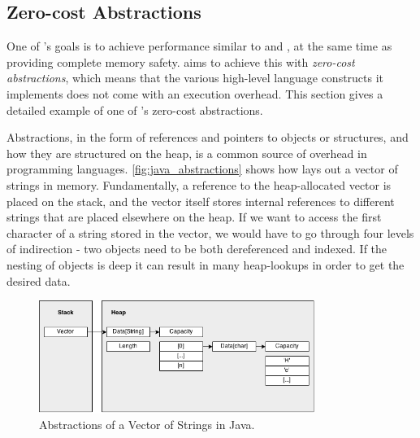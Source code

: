\subsection{Zero-cost Abstractions}
\label{chap:zero_cost_abstractions}

One of {\rust}'s goals is to achieve performance similar to {\C} and {\Cpp}, at the same time as providing complete memory safety.
{\rust} aims to achieve this with \emph{zero-cost abstractions}, which means that the various high-level language constructs it implements does not come with an execution overhead.
This section gives a detailed example of one of {\rust}'s zero-cost abstractions.

Abstractions, in the form of references and pointers to objects or structures, and how they are
structured on the heap, is a common source of overhead in programming languages.
\autoref{fig:java_abstractions} shows how {\Java} lays out a vector of
strings in memory.
Fundamentally, a reference to the heap-allocated vector is placed on the stack, and the vector itself stores internal references to different strings that are placed elsewhere on the heap.
If we want to access the first character of a string stored in the vector, we would have to go through four levels of indirection - two objects need to be both dereferenced and indexed.
If the nesting of objects is deep it can result in many heap-lookups in order to get the desired data.

\begin{figure}[tb]
  \begin{center}
    \includegraphics[width=0.8\textwidth]{figures/java_abstractions}
  \end{center}
  \caption{Abstractions of a Vector of Strings in Java.}
  \label{fig:java_abstractions}
\end{figure}


